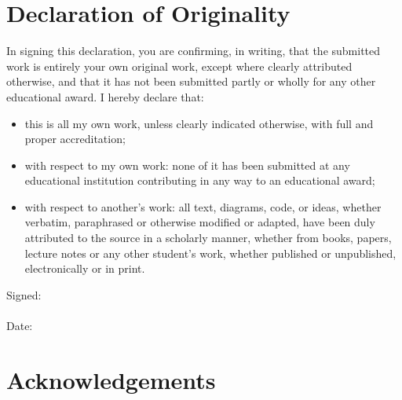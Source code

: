 \documentclass[12pt,pdftex,titlepage]{report}
\begin{document}
    \chapter*{Declaration of Originality}
        \begin{spacing}{1.0}
            In signing this declaration, you are confirming, in writing, that the submitted work
            is entirely your own original work, except where clearly attributed otherwise, and
            that it has not been submitted partly or wholly for any other educational award. I
            hereby declare that:
            \begin{itemize}
                \item this is all my own work, unless clearly indicated otherwise, with full and proper accreditation;  
                \item with respect to my own work: none of it has been submitted at any educational institution contributing in any way to an educational award;
                \item with respect to another’s work: all text, diagrams, code, or ideas, whether verbatim, paraphrased or otherwise modified or adapted, 
                have been duly attributed to the source in a scholarly manner, whether from books, papers, lecture notes or any other student’s work, whether
                published or unpublished, electronically or in print.
            \end{itemize}
            \vspace{10mm}
            Signed: \dotfill
            \\\\
            Date: \dotfill
        \end{spacing}

    \chapter*{Acknowledgements}
        \begin{spacing}{1.0}

        \end{spacing}
        
    \begin{spacing}{1.0}
        \tableofcontents
    \end{spacing}

    \begin{spacing}{1.0}
        \listoffigures
    \end{spacing}
\end{document}
